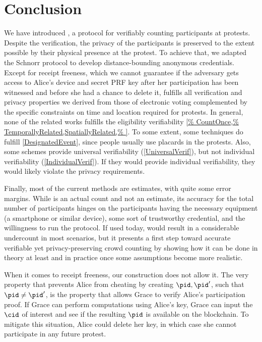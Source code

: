 \section{Conclusion}%
\label{Conclusion}

We have introduced \PRIVO, a protocol for verifiably counting participants at protests. Despite the verification, the privacy of the
participants is preserved to the extent possible by their physical
presence at the protest. To achieve that, we adapted the Schnorr
protocol to develop distance-bounding anonymous credentials. Except for receipt
freeness, which we cannot guarantee if the adversary gets access to
Alice's device and secret PRF key after her participation has
been witnessed and before she had a chance to
delete it, \PRIVO
fulfills all verification and privacy properties we derived from those
of electronic voting complemented by the specific constraints on time
and location required for protests. 
In general, none of the related works fulfills the eligibility verifiability 
\cref{%
  CountOnce,%
  TemporallyRelated,SpatiallyRelated,%
}.
To some extent, some techniques do fulfill \cref{DesignatedEvent}, since people 
usually use placards in the protests.
Also, some schemes provide universal verifiability (\cref{UniversalVerif}), but 
not individual verifiability (\cref{IndividualVerif}).
If they would provide individual verifiability, they would likely violate the 
privacy requirements.

Finally, most of the current methods are estimates, with quite some error 
margins. While \PRIVO is an actual count and not an estimate, its
accuracy for the total number of participants hinges on the
participants having the necessary equipment (a smartphone or similar
device), some sort of trustworthy credential, and the willingness to
run the protocol. If used today, \PRIVO would result in a
considerable undercount in most scenarios,  but it presents a first
step toward accurate verifiable yet privacy-preserving crowd counting
by showing how it can be done in theory at least and in practice once
some assumptions become more realistic. 

When it comes to receipt freeness, our construction does not allow it.
The very property that prevents Alice from cheating by creating \(\pid, \pid'\), 
such that \(\pid \neq \pid'\), is the property that allows Grace to verify 
Alice's participation proof.
If Grace can perform computations using Alice's key, Grace can input the 
\(\cid\) of interest and see if the resulting \(\pid\) is available on the 
blockchain.
To mitigate this situation, Alice could delete her key, in which case she cannot 
participate in any future protest.

